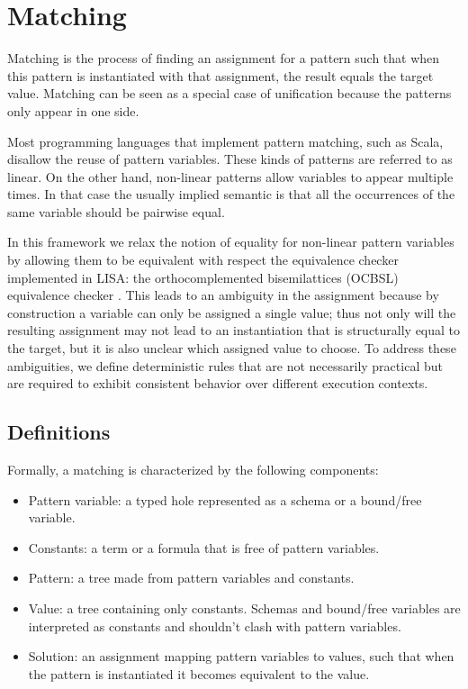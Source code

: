 \section{Matching}
\label{sec:matching}

Matching is the process of finding an assignment for a pattern such that when this pattern is instantiated with that assignment, the result equals the target value. Matching can be seen as a special case of unification because the patterns only appear in one side.

Most programming languages that implement pattern matching, such as Scala, disallow the reuse of pattern variables. These kinds of patterns are referred to as linear. On the other hand, non-linear patterns allow variables to appear multiple times. In that case the usually implied semantic is that all the occurrences of the same variable should be pairwise equal.

In this framework we relax the notion of equality for non-linear pattern variables by allowing them to be equivalent with respect the equivalence checker implemented in LISA: the orthocomplemented bisemilattices (OCBSL) equivalence checker \cite{Guilloud2022}. This leads to an ambiguity in the assignment because by construction a variable can only be assigned a single value; thus not only will the resulting assignment may not lead to an instantiation that is structurally equal to the target, but it is also unclear which assigned value to choose. To address these ambiguities, we define deterministic rules that are not necessarily practical but are required to exhibit consistent behavior over different execution contexts.

\subsection{Definitions}

Formally, a matching is characterized by the following components:

\begin{itemize}
\item Pattern variable: a typed hole represented as a schema or a bound/free variable.
\item Constants: a term or a formula that is free of pattern variables.
\item Pattern: a tree made from pattern variables and constants.
\item Value: a tree containing only constants. Schemas and bound/free variables are interpreted as constants and shouldn't clash with pattern variables.
\item Solution: an assignment mapping pattern variables to values, such that when the pattern is instantiated it becomes equivalent to the value.
\end{itemize}

